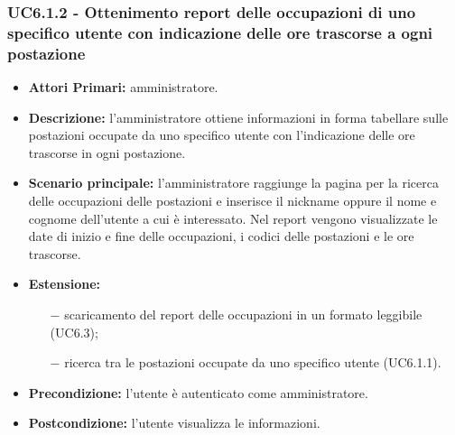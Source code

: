 \subsubsection{ UC6.1.2 - Ottenimento report delle occupazioni di uno specifico utente con indicazione delle ore trascorse a ogni postazione}
\begin{itemize}
	\item\textbf{Attori Primari:} 
	amministratore.
	\item\textbf{Descrizione:} 
	l'amministratore ottiene informazioni in forma tabellare sulle postazioni occupate da uno specifico utente con l'indicazione delle ore trascorse in ogni postazione.
	\item\textbf{Scenario principale:} 
	l'amministratore raggiunge la pagina per la ricerca delle occupazioni delle postazioni e inserisce il nickname oppure il nome e cognome dell'utente a cui è interessato.
	Nel report vengono visualizzate le date di inizio e fine delle occupazioni, i codici delle postazioni e le ore trascorse.
	\item\textbf{Estensione:}
	\begin{itemize}
		\item[$-$] scaricamento del report delle occupazioni in un formato leggibile (UC6.3);
		\item[$-$] ricerca tra le postazioni occupate da uno specifico utente (UC6.1.1).
	\end{itemize}
	\item\textbf{Precondizione:} 
	l'utente è autenticato come amministratore.
	\item\textbf{Postcondizione:}
	l'utente visualizza le informazioni.
\end{itemize}

